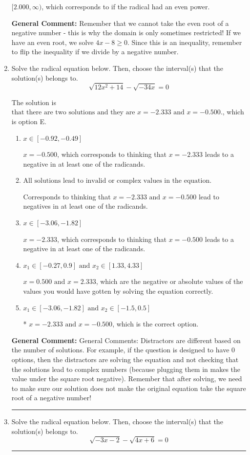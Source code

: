 \documentclass{extbook}[14pt]
\newcommand{\litem}[1]{\item #1

\rule{\textwidth}{0.4pt}}
\begin{document}
\begin{enumerate}
{\begin{enumerate}[label=\Alph*.]
$[2.000, \infty)$, which corresponds to if the radical had an even power.
\end{enumerate}

\textbf{General Comment:} Remember that we cannot take the even root of a negative number - this is why the domain is only sometimes restricted! If we have an even root, we solve $4 x - 8 \geq 0$. Since this is an inequality, remember to flip the inequality if we divide by a negative number.
}
\litem{
Solve the radical equation below. Then, choose the interval(s) that the solution(s) belongs to.
\[ \sqrt{12 x^2 + 14} - \sqrt{-34 x} = 0 \]

The solution is \( \text{that there are two solutions and they are } x = -2.333 \text{ and } x = -0.500. \), which is option E.\begin{enumerate}[label=\Alph*.]
\item \( x \in [-0.92,-0.49] \)

$x = -0.500$, which corresponds to thinking that $x = -2.333$ leads to a negative in at least one of the radicands.
\item \( \text{All solutions lead to invalid or complex values in the equation.} \)

Corresponds to thinking that $x = -2.333 \text{ and } x = -0.500$ lead to negatives in at least one of the radicands.
\item \( x \in [-3.06,-1.82] \)

$x = -2.333$, which corresponds to thinking that $x = -0.500$ leads to a negative in at least one of the radicands.
\item \( x_1 \in [-0.27, 0.9] \text{ and } x_2 \in [1.33,4.33] \)

$x = 0.500 \text{ and } x = 2.333$, which are the negative or absolute values of the values you would have gotten by solving the equation correctly.
\item \( x_1 \in [-3.06, -1.82] \text{ and } x_2 \in [-1.5,0.5] \)

* $x = -2.333 \text{ and } x = -0.500$, which is the correct option.
\end{enumerate}

\textbf{General Comment:} General Comments: Distractors are different based on the number of solutions. For example, if the question is designed to have 0 options, then the distractors are solving the equation and not checking that the solutions lead to complex numbers (because plugging them in makes the value under the square root negative). Remember that after solving, we need to make sure our solution does not make the original equation take the square root of a negative number!
}
\litem{
Solve the radical equation below. Then, choose the interval(s) that the solution(s) belongs to.
\[ \sqrt{-3 x - 2} - \sqrt{4 x + 6} = 0 \]

}
\end{enumerate}
\end{document}
